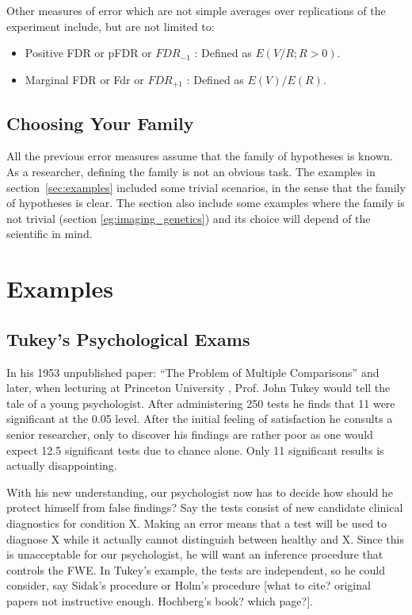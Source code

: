 \documentclass[draft,12pt]{article}
\begin{document}
Other measures of error which are not simple averages over replications of the experiment include, but are not limited to:
\begin{itemize}
\item Positive FDR or pFDR \citep{storey_direct_2002} or $FDR_{-1}$ \citep{benjamini_discovering_2010} : Defined as $E(V/R;R>0)$.
\item Marginal FDR \citep{sun_oracle_2007} or Fdr \citep{efron_microarrays_2008} or $FDR_{+1}$ \citep{benjamini_discovering_2010}: Defined as $E(V)/E(R)$.
\end{itemize}




\subsection{Choosing Your Family}
All the previous error measures assume that the family of hypotheses is known. As a researcher, defining the family is not an obvious task. The examples in section~\ref{sec:examples} included some trivial scenarios, in the sense that the family of hypotheses is clear. The section also include some examples where the family is not trivial (section \ref{eg:imaging_genetics}) and its choice will depend of the scientific in mind.




\section{\label{sec:examples}Examples}



\subsection{Tukey's Psychological Exams}
In his 1953 unpublished paper: ``The Problem of Multiple Comparisons'' \citep{benjamini_john_2002} and later, when lecturing at Princeton University \citet{donoho_higher_2004}, Prof. John Tukey would tell the tale of a young psychologist. After administering 250 tests he finds that 11 were significant at the 0.05 level. After the initial feeling of satisfaction he consults a senior researcher, only to discover his findings are rather poor as one  would expect 12.5 significant tests due to chance alone. Only 11 significant results is actually disappointing.


With his new understanding, our psychologist now has to decide how should he protect himself from false findings? 
Say the tests consist of new candidate clinical diagnostics for condition X. Making an error means that a test will be used to diagnose X while it actually cannot distinguish between healthy and X. Since this is unacceptable for our psychologist, he will want an inference procedure that controls the FWE. In Tukey's example, the tests are independent, so he could consider, say Sidak's procedure or Holm's procedure [what to cite? original papers not instructive enough. Hochberg's book? which page?].
\end{document}
